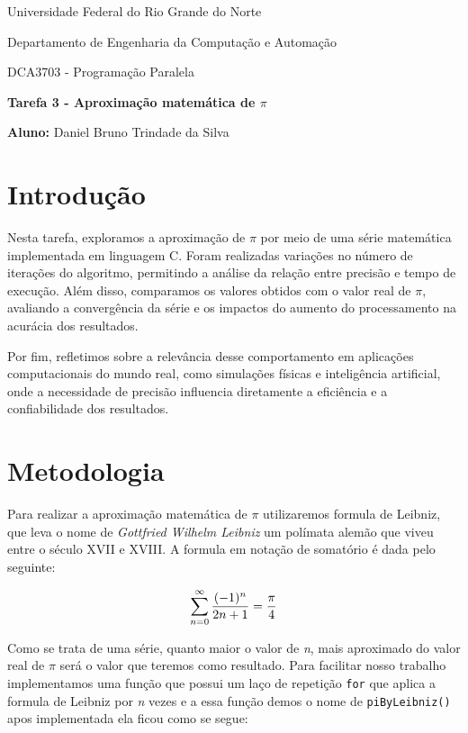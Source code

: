 \documentclass[a4paper, 12pt]{article}
\begin{document}
	\begin{center}
		Universidade Federal do Rio Grande do Norte
		
		Departamento de Engenharia da Computação e Automação
		
		DCA3703 - Programação Paralela
		
		\textbf{Tarefa 3 - Aproximação matemática de $\pi$}
		
		\textbf{Aluno:} Daniel Bruno Trindade da Silva
	\end{center}
	
	\section{Introdução}
	
		\hspace{.6cm}Nesta tarefa, exploramos a aproximação de $\pi$ por meio de uma série matemática implementada em linguagem C. Foram realizadas variações no número de iterações do algoritmo, permitindo a análise da relação entre precisão e tempo de execução. Além disso, comparamos os valores obtidos com o valor real de $\pi$, avaliando a convergência da série e os impactos do aumento do processamento na acurácia dos resultados.
		
		
		Por fim, refletimos sobre a relevância desse comportamento em aplicações computacionais do mundo real, como simulações físicas e inteligência artificial, onde a necessidade de precisão influencia diretamente a eficiência e a confiabilidade dos resultados.
		
	\section{Metodologia}
		\hspace{.6cm}Para realizar a aproximação matemática de $\pi$ utilizaremos formula de Leibniz, que leva o nome de \textit{Gottfried Wilhelm Leibniz} um polímata alemão que viveu entre o século XVII e XVIII. A formula em notação de somatório é dada pelo seguinte:
		
		\begin{center}
			\[
			{\Huge \sum_{n=0}^{\infty} \frac{(-1)^n}{2n+1} = \frac{\pi}{4}}
			\]
		\end{center}
		
		Como se trata de uma série, quanto maior o valor de \textit{n}, mais aproximado do valor real de  $\pi$ será o valor que teremos como resultado. Para facilitar nosso trabalho implementamos uma função que possui um laço de repetição \texttt{for} que aplica a formula de Leibniz por \textit{n} vezes e a essa função demos o nome de  \texttt{piByLeibniz()} apos implementada ela ficou como se segue:
	
\end{document}
